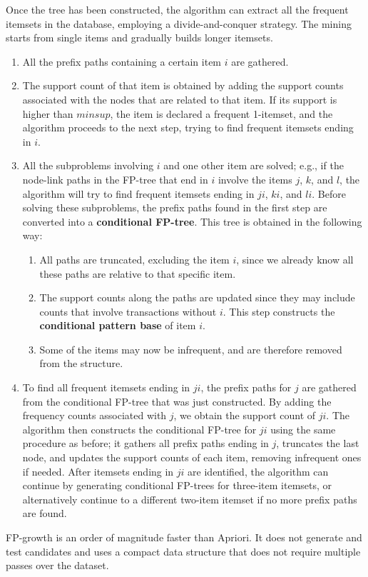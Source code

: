 Once the tree has been constructed, the algorithm can extract all the frequent itemsets in the database, employing a divide-and-conquer strategy. The mining starts from single items and gradually builds longer itemsets.
\begin{enumerate}
    \item All the prefix paths containing a certain item $i$ are gathered.

    \item The support count of that item is obtained by adding the support counts associated with the nodes that are related to that item. If its support is higher than $minsup$, the item is declared a frequent 1-itemset, and the algorithm proceeds to the next step, trying to find frequent itemsets ending in $i$.

    \item All the subproblems involving $i$ and one other item are solved; e.g., if the node-link paths in the FP-tree that end in $i$ involve the items $j$, $k$, and $l$, the algorithm will try to find frequent itemsets ending in $ji$, $ki$, and $li$. Before solving these subproblems, the prefix paths found in the first step are converted into a \textbf{conditional FP-tree}. This tree is obtained in the following way:
        \begin{enumerate}
            \item All paths are truncated,  excluding the item $i$, since we already know all these paths are relative to that specific item.
            
            \item The support counts along the paths are updated since they may include counts that involve transactions without $i$. This step constructs the \textbf{conditional pattern base} of item $i$.

            \item Some of the items may now be infrequent, and are therefore removed from the structure.
        \end{enumerate}

    \item To find all frequent itemsets ending in $ji$, the prefix paths for $j$ are gathered from the conditional FP-tree that was just constructed. By adding the frequency counts associated with $j$, we obtain the support count of $ji$. The algorithm then constructs the conditional FP-tree for $ji$ using the same procedure as before; it gathers all prefix paths ending in $j$, truncates the last node, and updates the support counts of each item, removing infrequent ones if needed. After itemsets ending in $ji$ are identified, the algorithm can continue by generating conditional FP-trees for three-item itemsets, or alternatively continue to a different two-item itemset if no more prefix paths are found.
\end{enumerate}

FP-growth is an order of magnitude faster than Apriori. It does not generate and test candidates and uses a compact data structure that does not require multiple passes over the dataset.